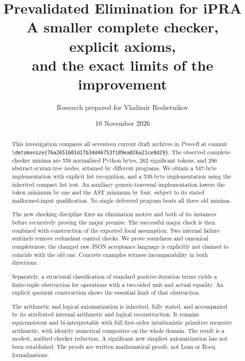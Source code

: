 \documentclass[11pt,letterpaper]{article}
\title{\color{ink}\bfseries Prevalidated Elimination for iPRA\\[8pt]
\large A smaller complete checker, explicit axioms,\\and the exact limits of the improvement}
\author{Research prepared for Vladimir Reshetnikov}
\date{10 November 2026}
\theoremstyle{definition}\newtheorem{definition}[theorem]{Definition}
\theoremstyle{remark}\newtheorem{remark}[theorem]{Remark}
\newcommand{\file}[1]{\expandafter\nolinkurl\expandafter{\detokenize{#1}}}
\begin{document}
\maketitle
\begin{abstract}
This investigation compares all seventeen current draft archives in
\emph{ProveIt} at commit
\file{76a2651601d17b34d46753f189ea026a21ce8d29}.
The observed complete-checker minima are 558 normalized Python bytes,
262 significant tokens, and 296 abstract-syntax-tree nodes, attained by
different programs. We obtain a 547-byte implementation with explicit
list recognition, and a 539-byte implementation using the inherited
compact list test. An auxiliary generic-traversal implementation lowers
the token minimum by one and the AST minimum by four, subject to its stated malformed-input
qualification. No single delivered program beats all three old minima.

The new checking discipline fixes an elimination motive and both of its
instances before recursively proving the major premise. The successful
major check is then combined with construction of the exported local
assumption. Two internal failure sentinels remove redundant control
checks. We prove soundness and canonical completeness; the changed raw
JSON acceptance language is explicitly not claimed to coincide with the
old one. Concrete examples witness incomparability in both directions.

Separately, a structural classification of standard positive-iteration
terms yields a finite-tuple obstruction for operations with a two-sided
unit and actual equality. An explicit quotient construction shows the
essential limit of that obstruction.

The arithmetic and logical axiomatization is inherited, fully stated,
and accompanied by its attributed internal arithmetic and logical
reconstruction. It remains equiconsistent and bi-interpretable with full
first-order intuitionistic primitive recursive arithmetic, with identity
numerical composites on the whole domain. The result is a modest, audited
checker reduction. A significant new simplest axiomatization has not
been established. The proofs are written mathematical proofs, not
Lean or Rocq formalizations.
\end{abstract}
\begin{center}
\end{center}
\clearpage
\setcounter{tocdepth}{1}
\hypersetup{bookmarksdepth=2}
\begingroup\small\setlength{\parskip}{0pt}\tableofcontents\endgroup
\clearpage
\end{document}
